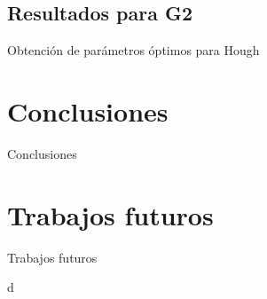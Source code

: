 \documentclass[spanish]{beamer}
\begin{document}
\subsection{Resultados para G2}
%
\begin{frame}{Obtención de parámetros óptimos para Hough}
%
\end{frame}
\section{Conclusiones}
\begin{frame}{Conclusiones}
\end{frame}
%
\section{Trabajos futuros}
\begin{frame}{Trabajos futuros}
\end{frame}
\begin{frame}{d}
\end{frame}
\end{document}
